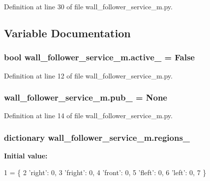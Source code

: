 Definition at line 30 of file wall\+\_\+follower\+\_\+service\+\_\+m.\+py.



\subsection{Variable Documentation}
\subsubsection[{\texorpdfstring{active\+\_\+}{active_}}]{\setlength{\rightskip}{0pt plus 5cm}bool wall\+\_\+follower\+\_\+service\+\_\+m.\+active\+\_\+ = False}\hypertarget{namespacewall__follower__service__m_a3808a035405c1350e8af8bf26e364509}{}\label{namespacewall__follower__service__m_a3808a035405c1350e8af8bf26e364509}


Definition at line 12 of file wall\+\_\+follower\+\_\+service\+\_\+m.\+py.

\subsubsection[{\texorpdfstring{pub\+\_\+}{pub_}}]{\setlength{\rightskip}{0pt plus 5cm}wall\+\_\+follower\+\_\+service\+\_\+m.\+pub\+\_\+ = None}\hypertarget{namespacewall__follower__service__m_aa92f44d061ddf4a546602a287ea64d11}{}\label{namespacewall__follower__service__m_aa92f44d061ddf4a546602a287ea64d11}


Definition at line 14 of file wall\+\_\+follower\+\_\+service\+\_\+m.\+py.

\subsubsection[{\texorpdfstring{regions\+\_\+}{regions_}}]{\setlength{\rightskip}{0pt plus 5cm}dictionary wall\+\_\+follower\+\_\+service\+\_\+m.\+regions\+\_\+}\hypertarget{namespacewall__follower__service__m_a326b63f9d570893bead600e2b51cf3a9}{}\label{namespacewall__follower__service__m_a326b63f9d570893bead600e2b51cf3a9}
{\bfseries Initial value\+:}
\begin{DoxyCode}
1 = \{
2     \textcolor{stringliteral}{'right'}: 0,
3     \textcolor{stringliteral}{'fright'}: 0,
4     \textcolor{stringliteral}{'front'}: 0,
5     \textcolor{stringliteral}{'fleft'}: 0,
6     \textcolor{stringliteral}{'left'}: 0,
7 \}
\end{DoxyCode}


